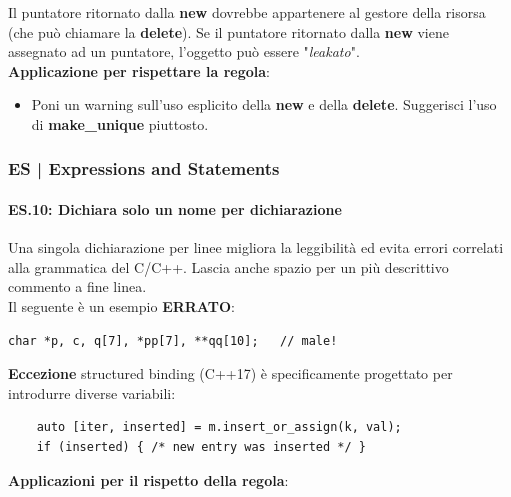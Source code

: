 \textsf{\small Il puntatore ritornato dalla \textbf{new} dovrebbe appartenere al gestore della risorsa (che può chiamare la \textbf{delete}). Se il puntatore ritornato dalla \textbf{new} viene assegnato ad un puntatore, l'oggetto può essere "\emph{leakato}".} \\

\textsf{\small \textbf{Applicazione per rispettare la regola}: }

\begin{itemize}
	\item \textsf{\small Poni un warning sull'uso esplicito della \textbf{new} e della \textbf{delete}. Suggerisci l'uso di \textbf{make\_unique} piuttosto.}
\end{itemize}


\subsubsection{ES | Expressions and Statements}

\label{ES_10}

\paragraph{ES.10: Dichiara solo un nome per dichiarazione}

\textsf{\small Una singola dichiarazione per linee migliora la leggibilità ed evita errori correlati alla grammatica del C/C++. Lascia anche spazio per un più descrittivo commento a fine linea. } \\

\textsf{\small Il seguente è un esempio \textbf{\color{red}ERRATO}\normalcolor: }

\begin{lstlisting}[frame=single, rulecolor=\color{red}]
	char *p, c, q[7], *pp[7], **qq[10];   // male!
\end{lstlisting}

\textsf{\small \textbf{Eccezione} structured binding (C++17) è specificamente progettato per introdurre diverse variabili: }

\begin{lstlisting}
	auto [iter, inserted] = m.insert_or_assign(k, val);
	if (inserted) { /* new entry was inserted */ }
\end{lstlisting}

\textsf{\small \textbf{Applicazioni per il rispetto della regola}: }

